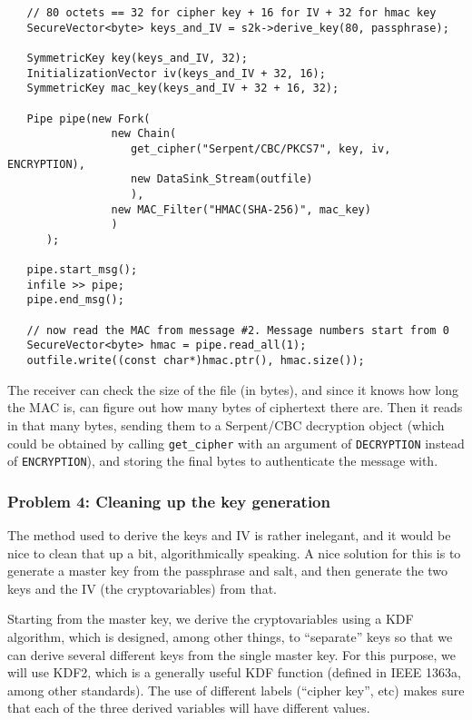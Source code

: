 \documentclass{article}
\newcommand{\type}[1]{\texttt{#1}}
\begin{document}
\begin{verbatim}
   // 80 octets == 32 for cipher key + 16 for IV + 32 for hmac key
   SecureVector<byte> keys_and_IV = s2k->derive_key(80, passphrase);

   SymmetricKey key(keys_and_IV, 32);
   InitializationVector iv(keys_and_IV + 32, 16);
   SymmetricKey mac_key(keys_and_IV + 32 + 16, 32);

   Pipe pipe(new Fork(
                new Chain(
                   get_cipher("Serpent/CBC/PKCS7", key, iv, ENCRYPTION),
                   new DataSink_Stream(outfile)
                   ),
                new MAC_Filter("HMAC(SHA-256)", mac_key)
                )
      );

   pipe.start_msg();
   infile >> pipe;
   pipe.end_msg();

   // now read the MAC from message #2. Message numbers start from 0
   SecureVector<byte> hmac = pipe.read_all(1);
   outfile.write((const char*)hmac.ptr(), hmac.size());
\end{verbatim}

The receiver can check the size of the file (in bytes), and since it knows how
long the MAC is, can figure out how many bytes of ciphertext there are. Then it
reads in that many bytes, sending them to a Serpent/CBC decryption object
(which could be obtained by calling \verb|get_cipher| with an argument of
\type{DECRYPTION} instead of \type{ENCRYPTION}), and storing the final bytes to
authenticate the message with.

\subsubsection{Problem 4: Cleaning up the key generation}

The method used to derive the keys and IV is rather inelegant, and it would be
nice to clean that up a bit, algorithmically speaking. A nice solution for this
is to generate a master key from the passphrase and salt, and then generate the
two keys and the IV (the cryptovariables) from that.

Starting from the master key, we derive the cryptovariables using a KDF
algorithm, which is designed, among other things, to ``separate'' keys so that
we can derive several different keys from the single master key. For this
purpose, we will use KDF2, which is a generally useful KDF function (defined in
IEEE 1363a, among other standards). The use of different labels (``cipher
key'', etc) makes sure that each of the three derived variables will have
different values.
\end{document}
